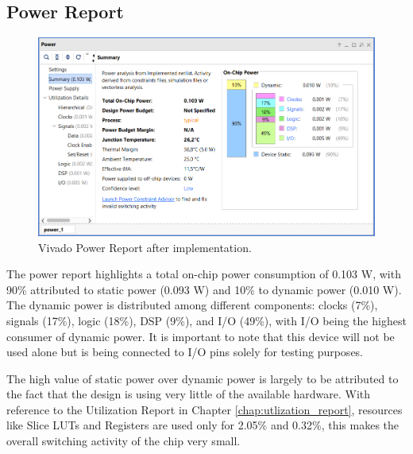 \subsection{Power Report}
\begin{figure}[H]
    \centering
    \captionsetup{skip=10pt} 
    \includegraphics[width=\textwidth]{./images/Vivado/power_report.png}
    \caption{Vivado Power Report after implementation.}
    \label{fig:power_report}
\end{figure}
The power report highlights a total on-chip power consumption of 0.103 W, with 90\% attributed to static power (0.093 W) and 10\% to dynamic power (0.010 W). The dynamic power is distributed among different components: clocks (7\%), signals (17\%), logic (18\%), DSP (9\%), and I/O (49\%), with I/O being the highest consumer of dynamic power. It is important to note that this device will not be used alone but is being connected to I/O pins solely for testing purposes.

The high value of static power over dynamic power is largely to be attributed to the fact that the design is using very little of the available hardware. With reference to the Utilization Report in Chapter \ref{chap:utlization_report}, resources like Slice LUTs and Registers are used only for 2.05\% and 0.32\%, this makes the overall switching activity of the chip very small.




